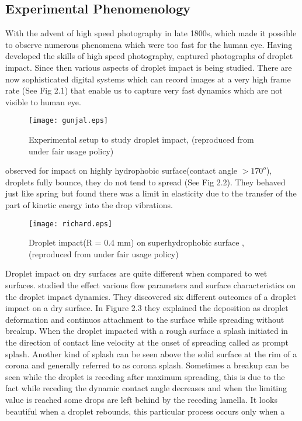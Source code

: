 \subsection{Experimental Phenomenology}
With the advent of high speed photography in late 1800s, which made it possible to observe numerous phenomena which were too fast for the human eye.
Having developed the skills of high speed photography, \cite{Worthington1908} captured photographs of droplet impact. Since then various aspects of
droplet impact is being studied. There are now sophisticated digital systems which can record images at a very high frame rate 
(See Fig 2.1) that enable us to capture very fast dynamics which are not visible to human eye.
\begin{figure}[tbp]
\centering
 \texttt{[image: gunjal.eps]}
 \caption[Experimental setup to study droplet impact]{Experimental setup to study droplet impact, (reproduced from \cite{Gunjal2005} under fair usage policy)}
\end{figure}
\cite{Richard2000} observed for impact on highly hydrophobic surface(contact angle $ > 170^o$), droplets fully bounce, they 
do not tend to spread (See Fig 2.2). They behaved just like spring but found there was a limit in elasticity due to the transfer
of the part of kinetic energy into the drop vibrations.
\begin{figure}[tbp]
\centering
 \texttt{[image: richard.eps]}
 \caption[Droplet impact on superhydrophobic surface]{Droplet impact(R = 0.4 mm) on superhydrophobic surface
 , (reproduced from \cite{Richard2000} under fair usage policy)}
\end{figure}
Droplet impact on dry surfaces are quite different when compared to wet surfaces. \cite{Rioboo2001} studied the effect
various flow parameters and surface characteristics on the droplet impact dynamics. They discovered six different outcomes of a droplet impact on 
a dry surface. In Figure 2.3 they explained the deposition as droplet deformation and continuos attachment to the surface while spreading without breakup. When
the droplet impacted with a rough surface a splash initiated in the direction of contact line velocity at the onset of spreading called as prompt splash.
Another kind of splash can be seen above the solid surface at the rim of a corona and generally referred to as corona splash.
Sometimes a breakup can be seen while the droplet is receding after maximum spreading, this is due to the fact while receding the dynamic contact angle decreases and when 
the limiting value is reached some drops are left behind by the receding lamella. It looks beautiful when a droplet rebounds, this particular process occurs only when a
